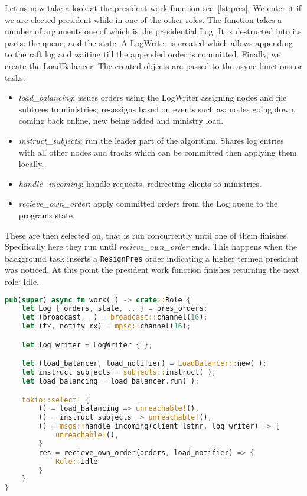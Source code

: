 Let us now take a look at the president work function see~\cref{lst:pres}. We enter it if we are elected president while in one of the other roles.
%
The function takes a number of arguments one of which is the presidential \raft{} Log. It is destructed into its parts: the queue, and the \raft{} state. A LogWriter is created which allows appending to the raft log and waiting till the appended order is committed. Finally, we create the LoadBalancer. The created objects are passed to the async functions or tasks: 
\begin{itemize}
	\item \textsl{load\_balancing}: issues orders using the LogWriter assigning nodes and file subtrees to ministries, re-assigns based on events such as: nodes going down, coming back online, new being added and ministry load.
	\item \textsl{instruct\_subjects}: run the leader part of the \raft{} algorithm. Shares log entries with all other nodes and tracks which can be committed then applying them locally.
	\item \textsl{handle\_incoming}: handle requests, redirecting clients to ministries.
	\item \textsl{recieve\_own\_order}: apply committed orders from the \raft{} Log queue to the programs state.
\end{itemize}
%
These are then selected on, that is run concurrently until one of them finishes. Specifically here they run until \textsl{recieve\_own\_order} ends. This happens when the \raft{} background task inserts a \lstinline[language=rust]{ResignPres} order indicating a higher termed president was noticed. At this point the president work function finishes returning the next role: Idle.

%
\begin{lstlisting}[float,language=rust,style=boxed,tabsize=2,caption={The president work function, it performs all the tasks of the president. In this code snippet brackets and parenthesis containing whitespace mean the corrosponding structs and functions have there arguments hidden for brevity},label=lst:pres]
pub(super) async fn work( ) -> crate::Role {
	let Log { orders, state, .. } = pres_orders;
	let (broadcast, _) = broadcast::channel(16);
	let (tx, notify_rx) = mpsc::channel(16);

	let log_writer = LogWriter { };

	let (load_balancer, load_notifier) = LoadBalancer::new( );
	let instruct_subjects = subjects::instruct( );
	let load_balancing = load_balancer.run( );

	tokio::select! {
		() = load_balancing => unreachable!(),
		() = instruct_subjects => unreachable!(),
		() = msgs::handle_incoming(client_lstnr, log_writer) => {
			unreachable!(),
		}
		res = recieve_own_order(orders, load_notifier) => {
			Role::Idle
		}
	}
}
\end{lstlisting}

